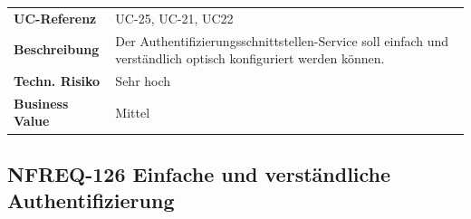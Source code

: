 \begin{longtable}[c]{@{}ll@{}}
\toprule
\begin{minipage}[t]{0.20\columnwidth}\raggedright\strut
\textbf{UC-Referenz}
\strut\end{minipage} &
\begin{minipage}[t]{0.74\columnwidth}\raggedright\strut
UC-25, UC-21, UC22
\strut\end{minipage}\tabularnewline
\begin{minipage}[t]{0.20\columnwidth}\raggedright\strut
\textbf{Beschreibung}
\strut\end{minipage} &
\begin{minipage}[t]{0.74\columnwidth}\raggedright\strut
Der Authentifizierungsschnittstellen-Service soll einfach und
verständlich optisch konfiguriert werden können.
\strut\end{minipage}\tabularnewline
\begin{minipage}[t]{0.20\columnwidth}\raggedright\strut
\textbf{Techn. Risiko}
\strut\end{minipage} &
\begin{minipage}[t]{0.74\columnwidth}\raggedright\strut
Sehr hoch
\strut\end{minipage}\tabularnewline
\begin{minipage}[t]{0.20\columnwidth}\raggedright\strut
\textbf{Business Value}
\strut\end{minipage} &
\begin{minipage}[t]{0.74\columnwidth}\raggedright\strut
Mittel
\strut\end{minipage}\tabularnewline
\bottomrule
\end{longtable}

\subsection{NFREQ-126 Einfache und verständliche
Authentifizierung}\label{nfreq-126-einfache-und-verstuxe4ndliche-authentifizierung}


